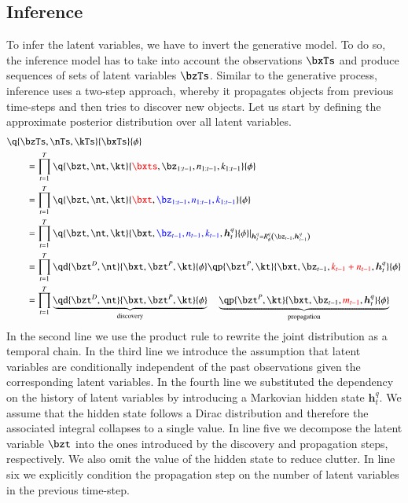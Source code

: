 \subsection{Inference}
To infer the latent variables, we have to invert the generative model. To do so, the inference model has to take into account the observations $\bxTs$ and produce sequences of sets of latent variables $\bzTs$. Similar to the generative process, inference uses a two-step approach, whereby it propagates objects from previous time-steps and then tries to discover new objects. Let us start by defining the approximate posterior distribution over all latent variables.
\begin{equation}
\begin{aligned}
    &\q{\bzTs, \nTs, \kTs}{\bxTs}{\phi} \\
%    
    &\qquad= \prod_{t=1}^T  \q{\bzt, \nt, \kt}{\textcolor{red}{\bxts}, \bz_{1:t-1}, n_{1:t-1}, k_{1:t-1}}{\phi}\\
%    
    &\qquad= \prod_{t=1}^T  \q{\bzt, \nt, \kt}{\textcolor{red}{\bxt}, \textcolor{blue}{\bz_{1:t-1}, n_{1:t-1}, k_{1:t-1}}}{\phi}\\
%    
    &\qquad= \prod_{t=1}^T  \q{\bzt, \nt, \kt}{\bxt, \textcolor{blue}{\bz_{t-1}, n_{t-1}, k_{t-1}}, \bm{h}_t^q}{\phi}\lvert_{\bm{h}_t^q = R^q_\phi \left( \bz_{t-1}, \bm{h}_{t-1}^q \right)} \\
%    
    &\qquad= \prod_{t=1}^T  \qd{\bzt^D, \nt}{\bxt, \bzt^P, \kt}{\phi} \qp{\bzt^P, \kt}{\bxt, \bz_{t-1}, \textcolor{red}{k_{t-1} + n_{t-1}}, \bm{h}_t^q}{\phi} \\
%    
    &\qquad= \prod_{t=1}^T  \underbrace{ \qd{\bzt^D, \nt}{\bxt, \bzt^P, \kt}{\phi}}_\mathrm{discovery} \quad \underbrace{\qp{\bzt^P, \kt}{\bxt, \bz_{t-1}, \textcolor{red}{m_{t-1}}, \bm{h}_t^q}{\phi}}_\mathrm{propagation} 
\end{aligned}
\end{equation}
In the second line we use the product rule to rewrite the joint distribution as a temporal chain. In the third line we introduce the assumption that latent variables are conditionally independent of the past observations given the corresponding latent variables. In the fourth line we substituted the dependency on the history of latent variables by introducing a Markovian hidden state $\bm{h}_t^q$. We assume that the hidden state follows a Dirac distribution and therefore the associated integral collapses to a single value. In line five we decompose the latent variable $\bzt$ into the ones introduced by the discovery and propagation steps, respectively. We also omit the value of the hidden state to reduce clutter. In line six we explicitly condition the propagation step on the number of latent variables in the previous time-step.

